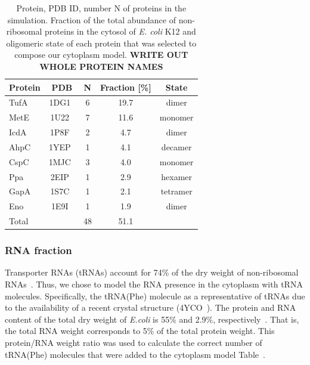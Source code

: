 \documentclass[journal=jcisd8,manuscript=article]{achemso}
\newcommand{\tabref}[1]{Table~\plainref{#1}}
\begin{document}
\begin{table}[H]
\centering
\caption{Protein, PDB ID, number N of proteins in the simulation. 
Fraction of the total abundance of non-ribosomal proteins in the cytosol of {\em
    E. coli} K12 and oligomeric state of each protein that was
  selected to compose our cytoplasm model. {\bf WRITE OUT WHOLE
    PROTEIN NAMES}}
\label{tbl:protein_fraction}
\begin{tabular}{lcccc}
\hline
Protein & PDB & N & Fraction [\%] & State\\
\hline
TufA & 1DG1~\cite{Abel1996}       & 6 & 19.7 &  dimer \\
MetE & 1U22~\cite{Ferrer2004}     & 7 & 11.6 &  monomer \\
IcdA & 1P8F~\cite{Mesecar2000}    & 2 & 4.7  &  dimer \\
AhpC & 1YEP~\cite{Parsonage2005}  & 1 & 4.1  &  decamer \\
CspC & 1MJC~\cite{Schindelin1994} & 3 & 4.0  &  monomer \\
Ppa  & 2EIP~\cite{Kankare1996}    & 1 & 2.9  &  hexamer \\
GapA & 1S7C~\cite{ShinXXX}        & 1 & 2.1  &  tetramer \\
Eno  & 1E9I~\cite{Kuhnel2001}     & 1 & 1.9  &  dimer \\
\hline
Total &                           & 48& 51.1 & \\
\hline
\end{tabular}
\end{table}


\subsubsection{RNA fraction}
Transporter RNAs (tRNAs) account for 74\% of the dry weight of
non-ribosomal RNAs~\cite{phillips2012}. Thus, we chose to model the
RNA presence in the cytoplasm with tRNA molecules. Specifically, 
 the tRNA(Phe) molecule as a representative of tRNAs due to
the availability of a recent crystal
structure (4YCO~\cite{Byrne2015}). The protein and RNA content of the total
dry weight of \textit{E.coli} is 55\% and 2.9\%,
respectively~\cite{phillips2012}. That is, the total RNA weight
corresponds to 5\% of the total protein weight. This protein/RNA
weight ratio was used to calculate the correct number of tRNA(Phe)
molecules that were added to the cytoplasm model
\tabref{tbl:soup_components}.
\end{document}
